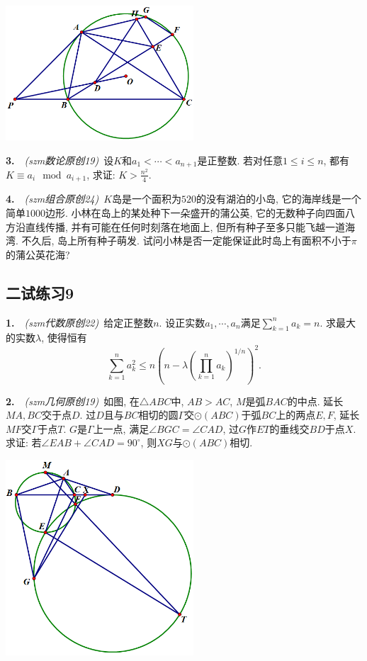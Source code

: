 \vspace{2em}
\includegraphics[width=7cm]{attachment/g18.png}

\newpage

\textbf{3.}~~\textit{(szm数论原创19)}~设$K$和$a_1 <\cdots <a_{n+1}$是正整数. 若对任意$1 \leq i \leq n$, 都有$K \equiv a_i \mod a_{i+1}$, 求证: $K>\frac{n^2}{4}$. 

\vspace{24em}

\textbf{4.}~~\textit{(szm组合原创24)}~$K$岛是一个面积为$520$的没有湖泊的小岛, 它的海岸线是一个简单$1000$边形. 小林在岛上的某处种下一朵盛开的蒲公英, 它的无数种子向四面八方沿直线传播, 并有可能在任何时刻落在地面上, 但所有种子至多只能飞越一道海湾. 不久后, 岛上所有种子萌发. 试问小林是否一定能保证此时岛上有面积不小于$\pi$的蒲公英花海? 

\newpage
\subsection*{二试练习9}

\textbf{1.}~~\textit{(szm代数原创22)}~给定正整数$n$. 设正实数$a_1,\cdots ,a_n$满足$\sum_{k=1}^{n}a_k=n$. 求最大的实数$\lambda$, 使得恒有$$\sum_{k=1}^{n} a_k^2 \leq n\left( n-\lambda\left( \prod_{k=1}^{n}a_k \right)^{1/n} \right)^2.$$

\vspace{22em}

\textbf{2.}~~\textit{(szm几何原创19)}~如图, 在$\triangle ABC$中, $AB>AC$, $M$是弧$BAC$的中点. 延长$MA,BC$交于点$D$. 过$D$且与$BC$相切的圆$\Gamma$交$\odot (ABC)$于弧$BC$上的两点$E,F$, 延长$MF$交$\Gamma$于点$T$. $G$是$\Gamma$上一点, 满足$\angle BGC = \angle CAD$, 过$G$作$ET$的垂线交$BD$于点$X$. 求证: 若$\angle EAB + \angle CAD = 90^{\circ}$, 则$XG$与$\odot (ABC)$相切. 

\vspace{2em}
\includegraphics[width=7cm]{attachment/g19.png}

